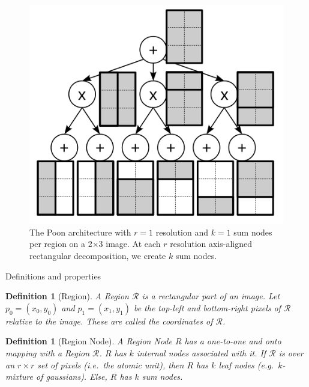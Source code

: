 \documentclass{amsart}
\makeatletter
\def\subsection{\@startsection{subsection}{3}%
  \z@{.5\linespacing\@plus.7\linespacing}{.1\linespacing}%
  {\normalfont}}
\newcommand{\region}{\mathcal}
\theoremstyle{plain}
\newcounter{dummy-def}\numberwithin{dummy-def}{section}
\newtheorem{definition}[dummy-def]{Definition}
\newcounter{dummy-thm}\numberwithin{dummy-thm}{section}
\newcounter{dummy-prop}\numberwithin{dummy-prop}{section}
\newcounter{dummy-corollary}\numberwithin{dummy-corollary}{section}
\newcounter{dummy-lemma}\numberwithin{dummy-lemma}{section}
\newcounter{dummy-ex}\numberwithin{dummy-ex}{section}
\newcounter{dummy-eg}\numberwithin{dummy-eg}{section}
\numberwithin{equation}{section}
\makeatother
\begin{document}
\begin{figure}[h]
  \centering
  \includegraphics[scale=1.0]{imgs/dv_spn.png}
  \captionsetup{justification=raggedright}
  \caption{The Poon architecture with $r=1$ resolution and $k=1$ sum nodes per region on a
  2$\times$3 image. At each $r$ resolution axis-aligned rectangular decomposition, we create $k$
  sum nodes.\cite{clustering}\label{fig:dv_spn}}
\end{figure}

\subsection{Definitions and properties}

\begin{definition}[Region]
  A Region $\region{R}$ is a rectangular part of an image. Let $p_0=(x_0, y_0)$ and $p_1=(x_1,
  y_1)$ be the top-left and bottom-right pixels of $\region{R}$ relative to the image. These are
  called the coordinates of $\region{R}$.
\end{definition}

\begin{definition}[Region Node]
  A Region Node $R$ has a one-to-one and onto mapping with a Region $\region{R}$. $R$ has $k$
  internal nodes associated with it. If $\region{R}$ is over an $r\times r$ set of pixels (i.e.\
  the atomic unit), then $R$ has $k$ leaf nodes (e.g.\ $k$-mixture of gaussians). Else, $R$ has $k$
  sum nodes.
\end{definition}
\end{document}
